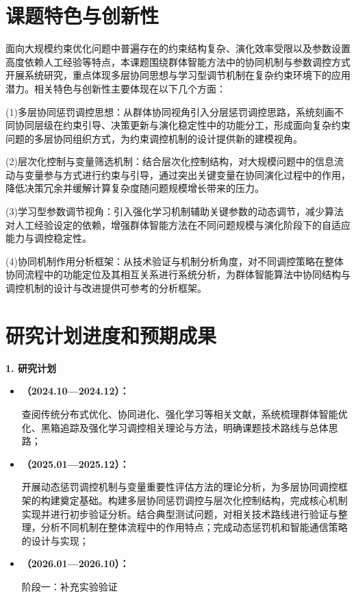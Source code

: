 \begin{titlepage}
\section{课题特色与创新性}
面向大规模约束优化问题中普遍存在的约束结构复杂、演化效率受限以及参数设置高度依赖人工经验等特点，本课题围绕群体智能方法中的协同机制与参数调控方式开展系统研究，重点体现多层协同思想与学习型调节机制在复杂约束环境下的应用潜力。相关特色与创新性主要体现在以下几个方面：
\par
\indent
(1)多层协同惩罚调控思想：从群体协同视角引入分层惩罚调控思路，系统刻画不同协同层级在约束引导、决策更新与演化稳定性中的功能分工，形成面向复杂约束问题的多层协同组织方式，为约束调控机制的设计提供新的建模视角。
\par
\indent
(2)层次化控制与变量筛选机制：结合层次化控制结构，对大规模问题中的信息流动与变量参与方式进行约束与引导，通过突出关键变量在协同演化过程中的作用，降低决策冗余并缓解计算复杂度随问题规模增长带来的压力。
\par
\indent
(3)学习型参数调节视角：引入强化学习机制辅助关键参数的动态调节，减少算法对人工经验设定的依赖，增强群体智能方法在不同问题规模与演化阶段下的自适应能力与调控稳定性。
\par
\indent
(4)协同机制作用分析框架：从技术验证与机制分析角度，对不同调控策略在整体协同流程中的功能定位及其相互关系进行系统分析，为群体智能算法中协同结构与调控机制的设计与改进提供可参考的分析框架。

\section{研究计划进度和预期成果}
 \noindent
 \textbf{1. 研究计划}
\begin{itemize}
    \item \textbf{（2024.10—2024.12）：}
 \par
\indent
查阅传统分布式优化、协同进化、强化学习等相关文献，系统梳理群体智能优化、黑箱追踪及强化学习调控相关理论与方法，明确课题技术路线与总体思路；
    \item \textbf{（2025.01—2025.12）：}
\par
\indent
开展动态惩罚调控机制与变量重要性评估方法的理论分析，为多层协同调控框架的构建奠定基础。构建多层协同惩罚调控与层次化控制结构，完成核心机制实现并进行初步验证分析。结合典型测试问题，对相关技术路线进行验证与整理，分析不同机制在整体流程中的作用特点；完成动态惩罚机和智能通信策略的设计与实现；
    
    \item \textbf{（2026.01—2026.10）：}
\par
\indent
阶段一：补充实验验证


\end{itemize}
\end{titlepage}
